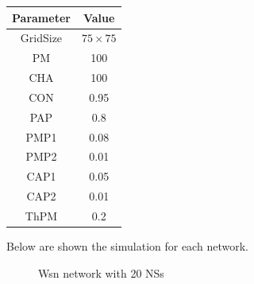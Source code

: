 \begin{center}
 \begin{tabular}{||c c||} 
 \hline
 Parameter & Value \\ [0.5ex] 
 \hline\hline
 GridSize & $75 \times 75$ \\ 
 \hline
 PM & 100 \\ 
 \hline
 CHA & 100 \\ 
 \hline
 CON & 0.95 \\ 
 \hline
 PAP & 0.8 \\ 
 \hline
 PMP1 & 0.08 \\ 
 \hline
 PMP2 & 0.01 \\ 
 \hline
 CAP1 & 0.05 \\ 
 \hline
 CAP2 & 0.01 \\ 
 \hline
 ThPM & 0.2 \\ [1ex] 
 \hline
 \end{tabular}
\end{center}

Below are shown the simulation for each network. 

\begin{figure}[H]
    \centering
    \caption{Wsn network with 20 NSs}
    \label{fig:foobar}
\end{figure}


